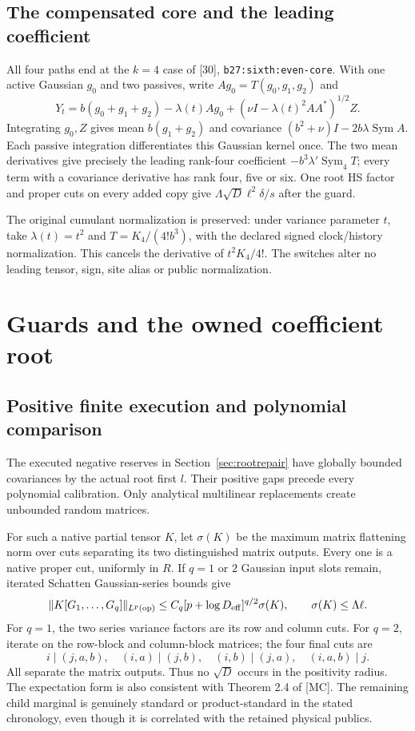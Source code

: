 \documentclass[11pt]{article}
\numberwithin{equation}{section}
\theoremstyle{remark}\newtheorem{remark}[theorem]{Remark}
\newcommand{\Sym}{\operatorname{Sym}}\newcommand{\HS}{\mathrm{HS}}
\newcommand{\op}{\mathrm{op}}\newcommand{\LL}{\Lambda}
\newcommand{\norm}[1]{\lVert#1\rVert}
\newcommand{\src}[1]{\texttt{\nolinkurl{#1}}}
\newcommand{\low}[1]{\textup{[30]}, \src{#1}}
\begin{document}
\subsection{The compensated core and the leading coefficient}
All four paths end at the $k=4$ case of \low{b27:sixth:even-core}. With one active Gaussian $g_0$ and two passives, write $Ag_0=T(g_0,g_1,g_2)$ and
\[
 Y_t=b(g_0+g_1+g_2)-\lambda(t)Ag_0
                   +(\nu I-\lambda(t)^2AA^*)^{1/2}Z.
\]
Integrating $g_0,Z$ gives mean $b(g_1+g_2)$ and covariance $(b^2+\nu)I-2b\lambda\Sym A$. Each passive integration differentiates this Gaussian kernel once. The two mean derivatives give precisely the leading rank-four coefficient $-b^3\lambda'\Sym_4T$; every term with a covariance derivative has rank four, five or six. One root HS factor and proper cuts on every added copy give $\LL\sqrt D\ell^2\delta/s$ after the guard.

The original cumulant normalization is preserved: under variance parameter $t$, take $\lambda(t)=t^2$ and $T=K_4/(4!b^3)$, with the declared signed clock/history normalization. This cancels the derivative of $t^2K_4/4!$. The switches alter no leading tensor, sign, site alias or public normalization.

\section{Guards and the owned coefficient root}
\label{sec:guards}
\subsection{Positive finite execution and polynomial comparison}
The executed negative reserves in Section~\ref{sec:rootrepair} have globally bounded covariances by the actual root first $l$. Their positive gaps precede every polynomial calibration. Only analytical multilinear replacements create unbounded random matrices.

For such a native partial tensor $K$, let $\sigma(K)$ be the maximum matrix flattening norm over cuts separating its two distinguished matrix outputs. Every one is a native proper cut, uniformly in $R$. If $q=1$ or $2$ Gaussian input slots remain, iterated Schatten Gaussian-series bounds give
\begin{equation}\label{eq:matrix-guard}
 \norm{K[G_1,\ldots,G_q]}_{L^p(\op)}
 \le C_q[p+\log D_{\rm eff}]^{q/2}\sigma(K),
 \qquad \sigma(K)\le\LL\ell.
\end{equation}
For $q=1$, the two series variance factors are its row and column cuts. For $q=2$, iterate on the row-block and column-block matrices; the four final cuts are
\[
 i\mid(j,a,b),\quad(i,a)\mid(j,b),\quad
 (i,b)\mid(j,a),\quad(i,a,b)\mid j.
\]
All separate the matrix outputs. Thus no $\sqrt D$ occurs in the positivity radius. The expectation form is also consistent with Theorem 2.4 of [MC]. The remaining child marginal is genuinely standard or product-standard in the stated chronology, even though it is correlated with the retained physical publics.
\end{document}
